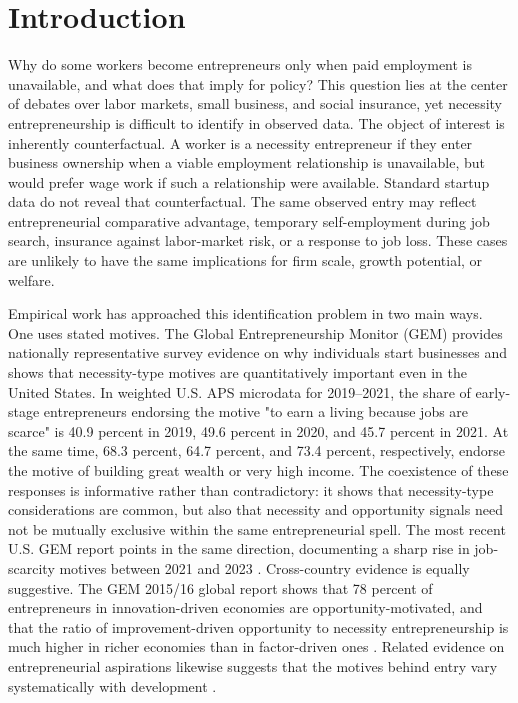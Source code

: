 
\section{Introduction}

Why do some workers become entrepreneurs only when paid employment is
unavailable, and what does that imply for policy? This question lies at the
center of debates over labor markets, small business, and social insurance, yet
necessity entrepreneurship is difficult to identify in observed data. The
object of interest is inherently counterfactual. A worker is a necessity
entrepreneur if they enter business ownership when a viable employment
relationship is unavailable, but would prefer wage work if such a relationship
were available. Standard startup data do not reveal that counterfactual. The
same observed entry may reflect entrepreneurial comparative advantage,
temporary self-employment during job search, insurance against labor-market
risk, or a response to job loss. These cases are unlikely to have the same
implications for firm scale, growth potential, or welfare.

Empirical work has approached this identification problem in two main ways. One
uses stated motives. The Global Entrepreneurship Monitor (GEM) provides
nationally representative survey evidence on why individuals start businesses
and shows that necessity-type motives are quantitatively important even in the
United States. In weighted U.S. APS microdata for 2019--2021, the share of
early-stage entrepreneurs endorsing the motive "to earn a living because jobs
are scarce" is 40.9 percent in 2019, 49.6 percent in 2020, and 45.7 percent in
2021. At the same time, 68.3 percent, 64.7 percent, and 73.4 percent,
respectively, endorse the motive of building great wealth or very high income.
The coexistence of these responses is informative rather than contradictory: it
shows that necessity-type considerations are common, but also that necessity
and opportunity signals need not be mutually exclusive within the same
entrepreneurial spell. The most recent U.S. GEM report points in the same
direction, documenting a sharp rise in job-scarcity motives between 2021 and
2023 \citep{gem_us_report_2024}. Cross-country evidence is equally suggestive.
The GEM 2015/16 global report shows that 78 percent of entrepreneurs in
innovation-driven economies are opportunity-motivated, and that the ratio of
improvement-driven opportunity to necessity entrepreneurship is much higher in
richer economies than in factor-driven ones
\citep{kelley_singer_herrington_2016}. Related evidence on entrepreneurial
aspirations likewise suggests that the motives behind entry vary systematically
with development \citep{chivers_2017}.

